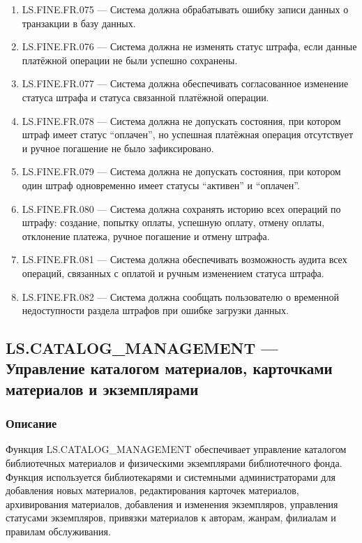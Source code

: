 \documentclass[12pt,a4paper]{article}
\begin{document}
\begin{enumerate}
		\item LS.FINE.FR.075 --- Система должна обрабатывать ошибку записи данных о
		транзакции в базу данных.
		
		\item LS.FINE.FR.076 --- Система должна не изменять статус штрафа, если данные
		платёжной операции не были успешно сохранены.
		
		\item LS.FINE.FR.077 --- Система должна обеспечивать согласованное изменение статуса
		штрафа и статуса связанной платёжной операции.
		
		\item LS.FINE.FR.078 --- Система должна не допускать состояния, при котором штраф
		имеет статус ``оплачен'', но успешная платёжная операция отсутствует и ручное
		погашение не было зафиксировано.
		
		\item LS.FINE.FR.079 --- Система должна не допускать состояния, при котором один
		штраф одновременно имеет статусы ``активен'' и ``оплачен''.
		
		\item LS.FINE.FR.080 --- Система должна сохранять историю всех операций по штрафу:
		создание, попытку оплаты, успешную оплату, отмену оплаты, отклонение платежа,
		ручное погашение и отмену штрафа.
		
		\item LS.FINE.FR.081 --- Система должна обеспечивать возможность аудита всех операций,
		связанных с оплатой и ручным изменением статуса штрафа.
		
		\item LS.FINE.FR.082 --- Система должна сообщать пользователю о временной
		недоступности раздела штрафов при ошибке загрузки данных.
	\end{enumerate}
	
	\subsection{LS.CATALOG\_MANAGEMENT --- Управление каталогом материалов, карточками материалов и экземплярами}
	
	\subsubsection{Описание}
	
	Функция LS.CATALOG\_MANAGEMENT обеспечивает управление каталогом библиотечных
	материалов и физическими экземплярами библиотечного фонда. Функция используется
	библиотекарями и системными администраторами для добавления новых материалов,
	редактирования карточек материалов, архивирования материалов, добавления и изменения
	экземпляров, управления статусами экземпляров, привязки материалов к авторам,
	жанрам, филиалам и правилам обслуживания.
	
\end{document}
